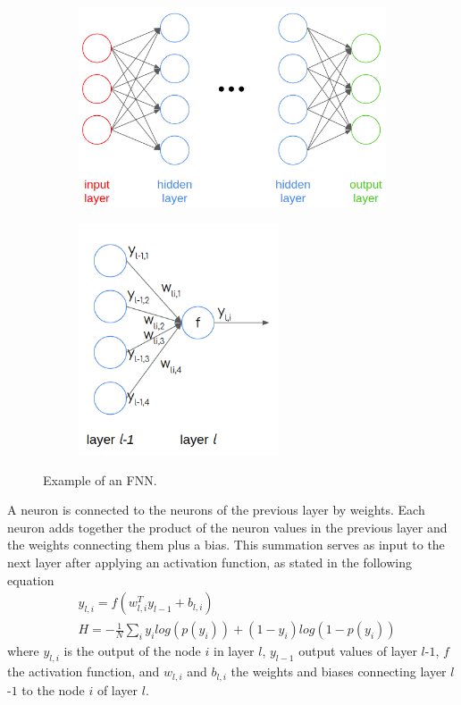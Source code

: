 \begin{figure}[htbp!] %
  \centering
  \begin{subfigure}[b]{0.51\textwidth}
    \centering
    \includegraphics[width=1.0\textwidth]{figures/fnn-1}
    \caption{}
  \end{subfigure}
  \hfill
  \begin{subfigure}[b]{0.47\textwidth}
    \centering
    \includegraphics[width=0.65\textwidth]{figures/fnn-2}
    \caption{}
  \end{subfigure}
  \hfill
  \caption{Example of an FNN.}
  \label{fig:3-fnn}
\end{figure}

A neuron is connected to the neurons of the previous layer by weights.
Each neuron adds together the product of the neuron values in the previous layer and the weights connecting them plus a bias.
This summation serves as input to the next layer after applying an activation function, as stated in the following equation
\begin{align}
& y_{l, i} = f(w_{l, i}^T y_{l-1} + b_{l, i}) \label{eq-fnn-1} \\
& H = -\frac{1}{N} \sum_i y_i log(p(y_i)) + (1 - y_i) log(1 - p(y_i)) \label{eq-fnn-2}
\end{align}
where $y_{l, i}$ is the output of the node $i$ in layer $l$, $y_{l-1}$ output values of layer $l$-$1$, $f$ the activation function, and $w_{l, i}$ and $b_{l, i}$ the weights and biases connecting layer $l$-$1$ to the node $i$ of layer $l$.

